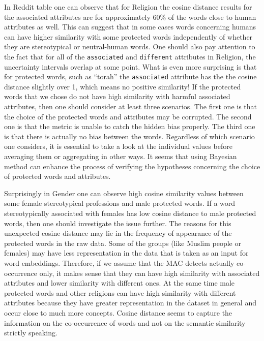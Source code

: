 \documentclass[12pt,]{book}
\begin{document}
In Reddit table one can observe that for Religion the cosine distance
results for the associated attributes are for approximately 60\% of the
words close to human attributes as well. This can suggest that in some
cases words concerning humans can have higher similarity with some
protected words independently of whether they are stereotypical or
neutral-human words. One should also pay attention to the fact that for
all of the \texttt{associated} and \texttt{different} attributes in
Religion, the uncertainty intervals overlap at some point. What is even
more surprising is that for protected words, such as ``torah'' the
\texttt{associated} attribute has the the cosine distance slightly over
1, which means no positive similarity! If the protected words that we
chose do not have high similarity with harmful associated attributes,
then one should consider at least three scenarios. The first one is that
the choice of the protected words and attributes may be corrupted. The
second one is that the metric is unable to catch the hidden bias
properly. The third one is that there is actually no bias between the
words. Regardless of which scenario one considers, it is essential to
take a look at the individual values before averaging them or
aggregating in other ways. It seems that using Bayesian method can
enhance the process of verifying the hypotheses concerning the choice of
protected words and attributes.

Surprisingly in Gender one can observe high cosine similarity values
between some female stereotypical professions and male protected words.
If a word stereotypically associated with females has low cosine
distance to male protected words, then one should investigate the issue
further. The reasons for this unexpected cosine distance may lie in the
frequency of appearance of the protected words in the raw data. Some of
the groups (like Muslim people or females) may have less representation
in the data that is taken as an input for word embeddings. Therefore, if
we assume that the MAC detects actually co-occurrence only, it makes
sense that they can have high similarity with associated attributes and
lower similarity with different ones. At the same time male protected
words and other religions can have high similarity with different
attributes because they have greater representation in the dataset in
general and occur close to much more concepts. Cosine distance seems to
capture the information on the co-occurrence of words and not on the
semantic similarity strictly speaking.
\end{document}
